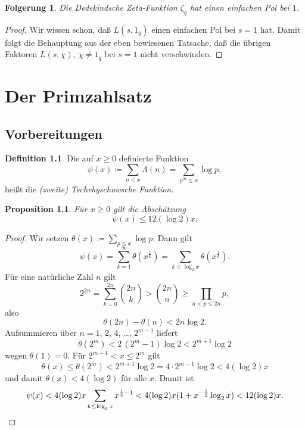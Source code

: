 \documentclass[a4paper,twoside,openright]{report}
\newtheorem{prop}[thm]{Proposition}
\newtheorem{cor}[thm]{Folgerung}
\theoremstyle{definition}
\newtheorem{dfn}[thm]{Definition}
\theoremstyle{remark}
\begin{document}
\begin{cor}
  Die Dedekindsche Zeta-Funktion $\zeta_q$ hat einen einfachen Pol bei $1$.
\end{cor}

\begin{proof}
  Wir wissen schon, daß $L(s, 1_q)$ einen einfachen Pol bei $s = 1$ hat. Damit
  folgt die Behauptung aus der eben bewiesenen Tatsache, daß die übrigen
  Faktoren $L(s, \chi)$, $\chi \neq 1_q$ bei $s = 1$ nicht verschwinden.
\end{proof}

\chapter{Der Primzahlsatz}


\section{Vorbereitungen}

\begin{dfn}
  Die auf $x \ge 0$ definierte Funktion
  \[
    \psi(x) \coloneqq \sum_{n \leq x} \Lambda(n) = \sum_{p^m \leq x} \log p,
  \]
  heißt die \emph{(zweite) Tschebyschowsche Funktion}.
\end{dfn}

\begin{prop}
  Für $x \ge 0$ gilt die Abschätzung
  \[
    \psi(x) \leq 12 (\log 2) x.
  \]
\end{prop}

\begin{proof}
  Wir setzen $\theta(x) \coloneqq \sum_{p \leq x} \log p$. Dann gilt
  \[
    \psi(x) = \sum_{k = 1}^\infty \theta(x^{\frac 1 k})
    = \sum_{k \leq \log_2 x} \theta(x^{\frac 1 k}).
  \]
  Für eine natürliche Zahl $n$ gilt
  \[
    2^{2n} = \sum_{k = 0}^{2n} \binom{2n} k > \binom{2n} n
    \ge \prod_{n < p \leq 2n} p,
  \]
  also
  \[
    \theta(2n) - \theta(n) < 2n \log 2.
  \]
  Aufsummieren über $n = 1$, $2$, $4$, \dots, $2^{m - 1}$ liefert
  \[
    \theta(2^m) < 2 \, (2^m - 1) \log 2 < 2^{m + 1} \log 2
  \]
  wegen $\theta(1) = 0$. 
  Für $2^{m - 1} < x \leq 2^m$ gilt
  \[
    \theta(x) \leq \theta(2^m) < 2^{m + 1} \log 2 = 4 \cdot 2^{m - 1} \log 2
    < 4 (\log 2) x
  \]
  und damit $\theta(x) < 4 (\log 2)$ für alle $x$.
  Damit ist
  \[
    \psi(x) < 4 (\log 2) x \sum_{k \leq \log_2 x} x^{\frac 1 k - 1}
    < 4 (\log 2) x (1 + x^{- \frac 1 2} \log_2 x)
    < 12 (\log 2) x.
    \qedhere
  \]
\end{proof}
\end{document}
